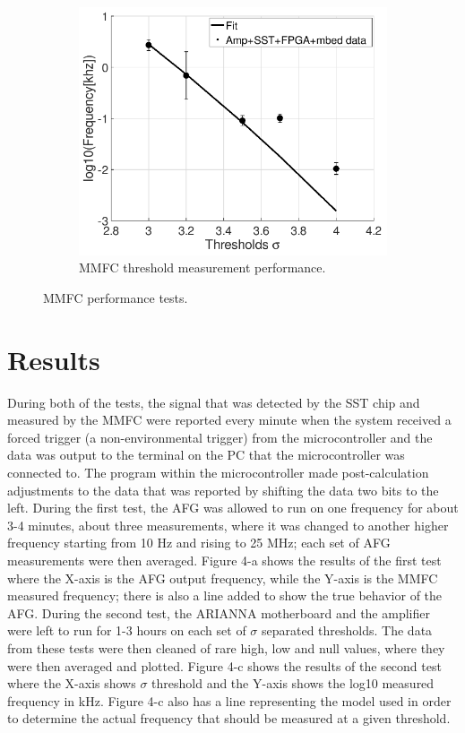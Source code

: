 \documentclass[journal]{IEEEtran}
\begin{document}
\begin{figure}[!htb]
	\begin{subfigure}[b]{\linewidth}
	\centering
	\includegraphics[scale=0.5]{scan.png}
	\caption{MMFC threshold measurement performance.}
\end{subfigure}

	\caption{MMFC performance tests.}
\end{figure}

\section{Results}
	During both of the tests, the signal that was detected by the SST chip and measured by the MMFC were reported every minute when the system received a forced trigger (a non-environmental trigger) from the microcontroller and the data was output to the terminal on the PC that the microcontroller was connected to.  The program within the microcontroller made post-calculation adjustments to the data that was reported by shifting the data two bits to the left.  During the first test, the AFG was allowed to run on one frequency for about 3-4 minutes, about three measurements, where it was changed to another higher frequency starting from 10 Hz and rising to 25 MHz; each set of AFG measurements were then averaged.  Figure 4-a shows the results of the first test where the X-axis is the AFG output frequency, while the Y-axis is the MMFC measured frequency; there is also a line added to show the true behavior of the AFG.  During the second test, the ARIANNA motherboard and the amplifier were left to run for 1-3 hours on each set of $\sigma$ separated thresholds.  The data from these tests were then cleaned of rare high, low and null values, where they were then averaged and plotted.  Figure 4-c shows the results of the second test where the X-axis shows $\sigma$ threshold and the Y-axis shows the log10 measured frequency in kHz.  Figure 4-c also has a line representing the model used in order to determine the actual frequency that should be measured at a given threshold.
\end{document}

